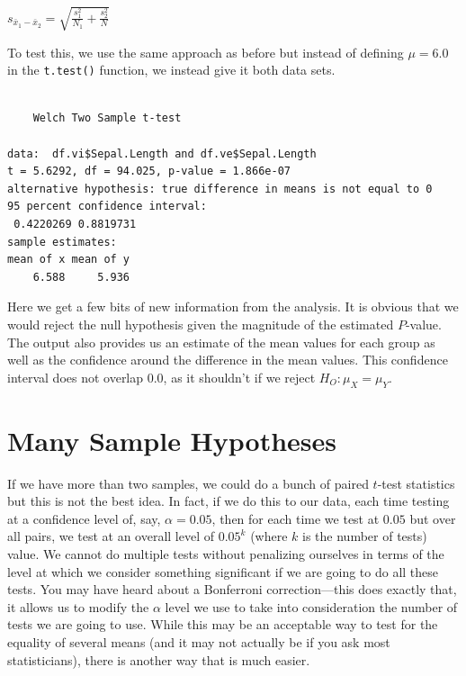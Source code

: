 \documentclass[
  letterpaper,
]{book}
\newenvironment{Shaded}{\begin{snugshade}}{\end{snugshade}}
\newcommand{\AttributeTok}[1]{\textcolor[rgb]{0.40,0.45,0.13}{#1}}
\newcommand{\FunctionTok}[1]{\textcolor[rgb]{0.28,0.35,0.67}{#1}}
\newcommand{\NormalTok}[1]{\textcolor[rgb]{0.00,0.23,0.31}{#1}}
\newcommand{\SpecialCharTok}[1]{\textcolor[rgb]{0.37,0.37,0.37}{#1}}
\begin{document}
\(s_{\bar{x}_1-\bar{x}_2} = \sqrt{ \frac{s_1^2}{N_1}+\frac{s_2^2}{N}}\)

To test this, we use the same approach as before but instead of defining
\(\mu = 6.0\) in the \texttt{t.test()} function, we instead give it both
data sets.

\begin{Shaded}
\end{Shaded}

\begin{verbatim}

    Welch Two Sample t-test

data:  df.vi$Sepal.Length and df.ve$Sepal.Length
t = 5.6292, df = 94.025, p-value = 1.866e-07
alternative hypothesis: true difference in means is not equal to 0
95 percent confidence interval:
 0.4220269 0.8819731
sample estimates:
mean of x mean of y 
    6.588     5.936 
\end{verbatim}

Here we get a few bits of new information from the analysis. It is
obvious that we would reject the null hypothesis given the magnitude of
the estimated \(P\)-value. The output also provides us an estimate of
the mean values for each group as well as the confidence around the
difference in the mean values. This confidence interval does not overlap
0.0, as it shouldn't if we reject \(H_O: \mu_X = \mu_Y\).

\section{Many Sample Hypotheses}\label{many-sample-hypotheses}

If we have more than two samples, we could do a bunch of paired
\(t\)-test statistics but this is not the best idea. In fact, if we do
this to our data, each time testing at a confidence level of, say,
\(\alpha = 0.05\), then for each time we test at \(0.05\) but over all
pairs, we test at an overall level of \(0.05^k\) (where \(k\) is the
number of tests) value. We cannot do multiple tests without penalizing
ourselves in terms of the level at which we consider something
significant if we are going to do all these tests. You may have heard
about a Bonferroni correction---this does exactly that, it allows us to
modify the \(\alpha\) level we use to take into consideration the number
of tests we are going to use. While this may be an acceptable way to
test for the equality of several means (and it may not actually be if
you ask most statisticians), there is another way that is much easier.
\end{document}
